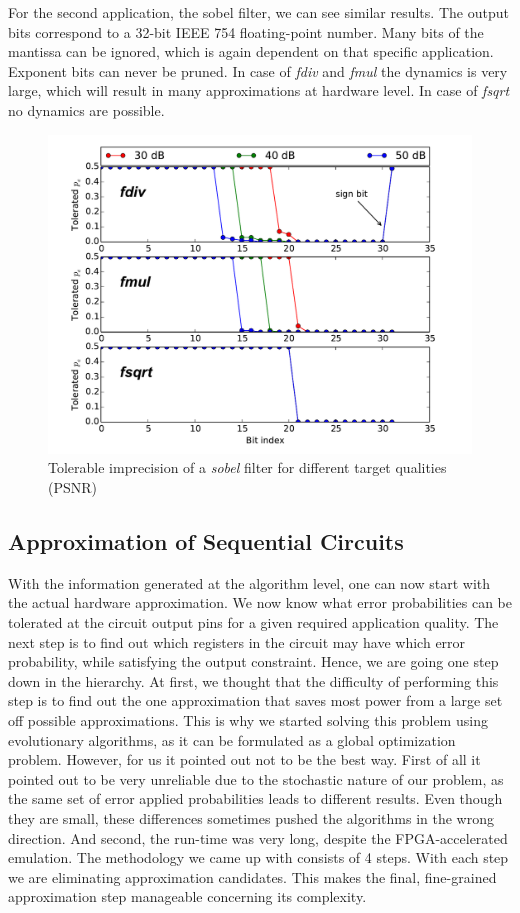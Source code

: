 \documentclass[conference]{IEEEtran}
\begin{document}
For the second application, the sobel filter, we can see similar results. The output bits correspond to a 32-bit IEEE 754 floating-point number. Many bits of the mantissa can be ignored, which is again dependent on that specific application. Exponent bits can never be pruned. In case of \emph{fdiv} and \emph{fmul} the dynamics is very large, which will result in many approximations at hardware level. In case of \emph{fsqrt} no dynamics are possible.
\begin{figure}[tb]
  \centering
  \includegraphics[width=.5\textwidth]{figs/metrics_sobel}
  \caption{Tolerable imprecision of a \emph{sobel} filter for different target qualities (PSNR)}
  \label{fig:metrics_sobel}
\end{figure}


\subsection{Approximation of Sequential Circuits}
\label{subsec:approximation}
With the information generated at the algorithm level, one can now start with the actual hardware approximation. We now know what error probabilities can be tolerated at the circuit output pins for a given required application quality. The next step is to find out which registers in the circuit may have which error probability, while satisfying the output constraint. Hence, we are going one step down in the hierarchy. At first, we thought that the difficulty of performing this step is to find out the one approximation that saves most power from a large set off possible approximations. This is why we started solving this problem using evolutionary algorithms, as it can be formulated as a global optimization problem. However, for us it pointed out not to be the best way. First of all it pointed out to be very unreliable due to the stochastic nature of our problem, as the same set of error applied probabilities leads to different results. Even though they are small, these differences sometimes pushed the algorithms in the wrong direction. And second, the run-time was very long, despite the FPGA-accelerated emulation. The methodology we came up with consists of 4 steps. With each step we are eliminating approximation candidates. This makes the final, fine-grained approximation step manageable concerning its complexity.
\end{document}
